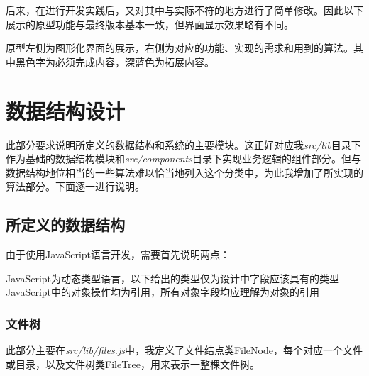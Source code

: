 \documentclass[scheme = chinese]{ctexart}
\begin{document}
后来，在进行开发实践后，又对其中与实际不符的地方进行了简单修改。因此以下展示的原型功能与最终版本基本一致，但界面显示效果略有不同。

原型左侧为图形化界面的展示，右侧为对应的功能、实现的需求和用到的算法。其中黑色字为必须完成内容，深蓝色为拓展内容。



\section{数据结构设计}
此部分要求说明所定义的数据结构和系统的主要模块。这正好对应我\emph{src/lib}目录下作为基础的数据结构模块和\emph{src/components}目录下实现业务逻辑的组件部分。但与数据结构地位相当的一些算法难以恰当地列入这个分类中，为此我增加了所实现的算法部分。下面逐一进行说明。

\subsection{所定义的数据结构}
由于使用JavaScript语言开发，需要首先说明两点：
\begin{outline}
    \1 JavaScript为动态类型语言，以下给出的类型仅为设计中字段应该具有的类型
    \1 JavaScript中的对象操作均为引用，所有对象字段均应理解为对象的引用
\end{outline}

\subsubsection{文件树}
此部分主要在\emph{src/lib/files.js}中，我定义了文件结点类FileNode，每个对应一个文件或目录，以及文件树类FileTree，用来表示一整棵文件树。
\end{document}
